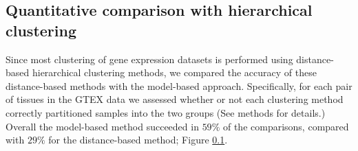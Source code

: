 




\subsection{Quantitative comparison with hierarchical clustering}

Since most clustering of gene expression datasets is performed using distance-based hierarchical clustering methods, we compared the accuracy of these distance-based methods with the model-based approach. Specifically, for each pair of tissues in the GTEX data we assessed whether or not each clustering method
correctly partitioned samples into the two groups (See methods for details.) Overall the model-based method succeeded in $59 \%$ of the comparisons, compared with $29 \%$ for the distance-based method; Figure \ref{}.

